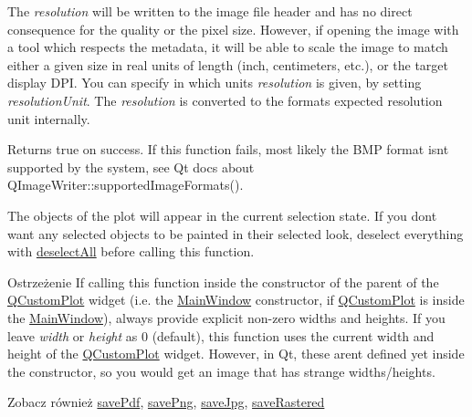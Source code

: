 The {\itshape resolution} will be written to the image file header and has no direct consequence for the quality or the pixel size. However, if opening the image with a tool which respects the metadata, it will be able to scale the image to match either a given size in real units of length (inch, centimeters, etc.), or the target display D\+PI. You can specify in which units {\itshape resolution} is given, by setting {\itshape resolution\+Unit}. The {\itshape resolution} is converted to the format\textquotesingle{}s expected resolution unit internally.

Returns true on success. If this function fails, most likely the B\+MP format isn\textquotesingle{}t supported by the system, see Qt docs about Q\+Image\+Writer\+::supported\+Image\+Formats().

The objects of the plot will appear in the current selection state. If you don\textquotesingle{}t want any selected objects to be painted in their selected look, deselect everything with \hyperlink{class_q_custom_plot_a9d4808ab925b003054085246c92a257c}{deselect\+All} before calling this function.

\begin{DoxyWarning}{Ostrzeżenie}
If calling this function inside the constructor of the parent of the \hyperlink{class_q_custom_plot}{Q\+Custom\+Plot} widget (i.\+e. the \hyperlink{class_main_window}{Main\+Window} constructor, if \hyperlink{class_q_custom_plot}{Q\+Custom\+Plot} is inside the \hyperlink{class_main_window}{Main\+Window}), always provide explicit non-\/zero widths and heights. If you leave {\itshape width} or {\itshape height} as 0 (default), this function uses the current width and height of the \hyperlink{class_q_custom_plot}{Q\+Custom\+Plot} widget. However, in Qt, these aren\textquotesingle{}t defined yet inside the constructor, so you would get an image that has strange widths/heights.
\end{DoxyWarning}
\begin{DoxySeeAlso}{Zobacz również}
\hyperlink{class_q_custom_plot_ad5acd34f6b39c3516887d7e54fec2412}{save\+Pdf}, \hyperlink{class_q_custom_plot_ac92cc9256d12f354b40a4be4600b5fb9}{save\+Png}, \hyperlink{class_q_custom_plot_a76f0d278e630a711fa6f48048cfd83e4}{save\+Jpg}, \hyperlink{class_q_custom_plot_ad7723ce2edfa270632ef42b03a444352}{save\+Rastered} 
\end{DoxySeeAlso}

